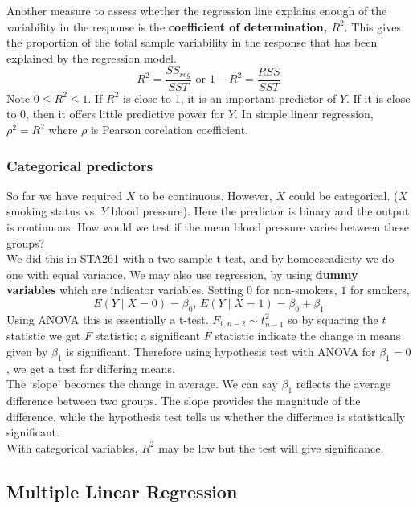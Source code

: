 \documentclass[12pt, a4paper]{article}
\theoremstyle{definition}
\newcommand{\f}{\frac}
\begin{document}
		Another measure to assess whether the regression line explains enough of the variability in the response is the {\bf coefficient of determination, $R^2$}. This gives the proportion of the total sample variability in the response that has been explained by the regression model.
		$$
			R^2 = \f{SS_{reg}}{SST} \text{ or } 1- R^2 = \f{RSS}{SST}
		$$
		Note $0 \leq R^2 \leq 1$. If $R^2$ is close to 1, it is an important predictor of $Y$. If it is close to 0, then it offers little predictive power for $Y$. In simple linear regression, $\rho^2 = R^2$ where $\rho$ is Pearson corelation coefficient.
	
		\subsubsection{Categorical predictors}
		
		So far we have required $X$ to be continuous. However, $X$ could be categorical. ($X$ smoking status vs. $Y$ blood pressure). Here the predictor is binary and the output is continuous. How would we test if the mean blood pressure varies between these groups?\\
		
		We did this in STA261 with a two-sample t-test, and by homoescadicity we do one with equal variance. We may also use regression, by using {\bf dummy variables} which are indicator variables. Setting $0$ for non-smokers, $1$ for smokers,
		$$
			E(Y \mid X = 0) = \beta_0,\, E(Y \mid X = 1) = \beta_0 + \beta_1
		$$
		Using ANOVA this is essentially a t-test. $F_{1,n-2} \sim t^2_{n-1}$ so by squaring the $t$ statistic we get $F$ statistic; a significant $F$ statistic indicate the change in means given by $\beta_1$ is significant. Therefore using hypothesis test with ANOVA for $\beta_1 = 0$, we get a test for differing means.\\
		
		The `slope' becomes the change in average. We can say $\beta_1$ reflects the average difference between two groups. The slope provides the magnitude of the difference, while the hypothesis test tells us whether the difference is statistically significant. \\
		
		With categorical variables, $R^2$ may be low but the test will give significance.
		
		\subsection{Multiple Linear Regression}
		
\end{document}
